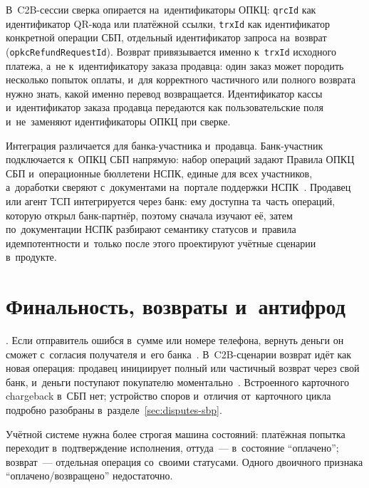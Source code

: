 В~C2B-сессии сверка опирается на~идентификаторы ОПКЦ:
\texttt{qrcId} как идентификатор QR-кода или платёжной ссылки,
\texttt{trxId} как идентификатор конкретной операции СБП, отдельный
идентификатор запроса на~возврат (\texttt{opkcRefundRequestId}). Возврат
привязывается именно к~\texttt{trxId} исходного платежа, а~не к~идентификатору заказа продавца: один заказ может
породить несколько попыток оплаты, и~для корректного частичного или полного
возврата нужно знать, какой именно перевод возвращается. Идентификатор кассы
и~идентификатор заказа продавца передаются как пользовательские поля
и~не~заменяют идентификаторы ОПКЦ при сверке.

Интеграция различается для банка-участника и~продавца. Банк-участник
подключается к~ОПКЦ СБП напрямую:
набор операций задают Правила ОПКЦ СБП и~операционные бюллетени НСПК, единые
для всех участников, а~доработки сверяют с~документами на~портале поддержки
НСПК~\cite{cbr-sbp-actions,nspk-sbp-rules}. Продавец или агент ТСП интегрируется
через банк: ему доступна та~часть операций, которую открыл банк-партнёр, поэтому
сначала изучают её, затем по~документации НСПК разбирают семантику статусов
и~правила идемпотентности и~только после этого проектируют учётные сценарии
в~продукте.

\section{Финальность, возвраты и~антифрод}\label{sec:sbp-finality}

. Если отправитель ошибся
в~сумме или номере телефона, вернуть деньги он сможет с~согласия получателя
и~его банка~\cite{sbp-faq-transfers}. В~C2B-сценарии возврат идёт как новая
операция: продавец инициирует полный или частичный возврат через свой банк,
и~деньги поступают покупателю моментально~\cite{sbp-faq-business}. Встроенного
карточного chargeback в~СБП нет; устройство споров и~отличия
от~карточного цикла подробно разобраны в~разделе~\ref{sec:disputes-sbp}.

Учётной системе нужна более строгая машина состояний: платёжная попытка
переходит в~подтверждение исполнения, оттуда~--- в~состояние \enquote{оплачено};
возврат~--- отдельная операция со~своими статусами. Одного двоичного признака
\enquote{оплачено/возвращено} недостаточно.

